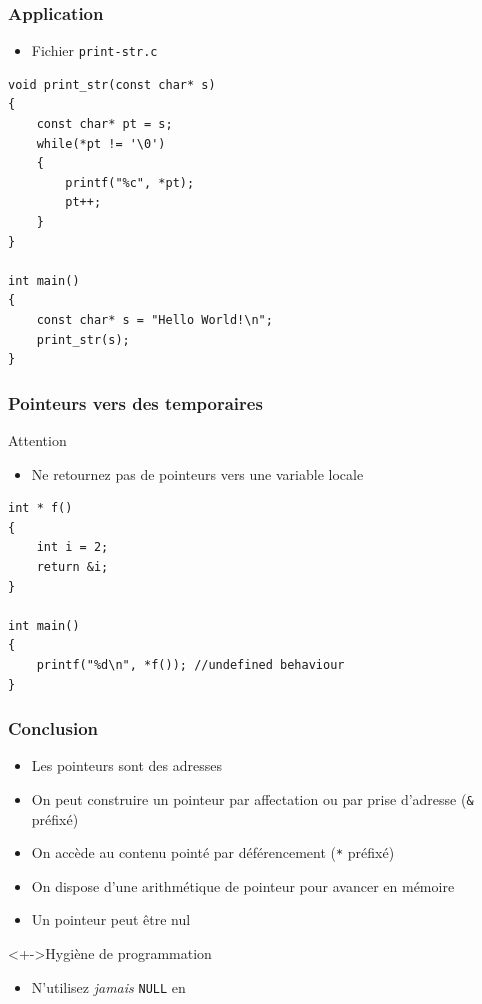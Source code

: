 \begin{frame}[containsverbatim]
\frametitle{Application}
\begin{itemize}
\item Fichier \texttt{print-str.c}
\end{itemize}
\begin{lstlisting}
void print_str(const char* s)
{
	const char* pt = s;
	while(*pt != '\0')
	{
		printf("%c", *pt); 
		pt++;
	}
}

int main()
{
	const char* s = "Hello World!\n";
	print_str(s);
}
\end{lstlisting}
\end{frame}

\begin{frame}[containsverbatim]
\frametitle{Pointeurs vers des temporaires}
\begin{alertblock}{Attention}
	\begin{itemize}
	\item Ne retournez pas de pointeurs vers une variable locale
	\end{itemize}
\end{alertblock}
\begin{lstlisting}
int * f()
{
	int i = 2;
	return &i;
}

int main()
{
	printf("%d\n", *f()); //undefined behaviour
}
\end{lstlisting}
\end{frame}

\begin{frame}
\frametitle{Conclusion}
\begin{itemize}[<+->]
\item Les pointeurs sont des adresses
\item On peut construire un pointeur par affectation ou par prise d'adresse (\texttt{\&} préfixé)
\item On accède au contenu pointé par déférencement (\texttt{*} préfixé)
\item On dispose d'une arithmétique de pointeur pour avancer en mémoire
\item Un pointeur peut être nul
\end{itemize}
\begin{block}<+->{Hygiène de programmation}
	\begin{itemize}[<+->]
	\item N'utilisez \emph{jamais} \lstinline|NULL| en \cpp
	\end{itemize}
\end{block}
\end{frame}

